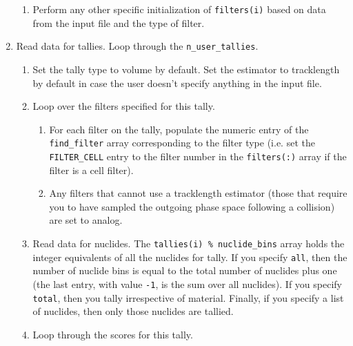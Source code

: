 \documentclass[10pt]{article}
\numberwithin{equation}{section} %
\begin{document}
\begin{enumerate}
\begin{enumerate}
	\item Perform any other specific initialization of {\tt filters(i)} based on data from the input file and the type of filter.
	\end{enumerate}
\item Read data for tallies. Loop through the {\tt n\_user\_tallies}.
	\begin{enumerate}
	\item Set the tally type to volume by default. Set the estimator to tracklength by default in case the user doesn't specify anything in the input file. %
	\item Loop over the filters specified for this tally.	
		\begin{enumerate}
		\item For each filter on the tally, populate the numeric entry of the {\tt find\_filter} array corresponding to the filter type (i.e. set the {\tt FILTER\_CELL} entry to the filter number in the {\tt filters(:)} array if the filter is a cell filter). %
		\item Any filters that cannot use a tracklength estimator (those that require you to have sampled the outgoing phase space following a collision) are set to analog.
		\end{enumerate}
	\item Read data for nuclides. The {\tt tallies(i) \% nuclide\_bins} array holds the integer equivalents of all the nuclides for tally. If you specify {\tt all}, then the number of nuclide bins is equal to the total number of nuclides plus one (the last entry, with value {\tt -1}, is the sum over all nuclides). If you specify {\tt total}, then you tally irrespective of material. Finally, if you specify a list of nuclides, then only those nuclides are tallied.
	\item Loop through the scores for this tally.
		

\end{enumerate}
\end{enumerate}
\end{document}
